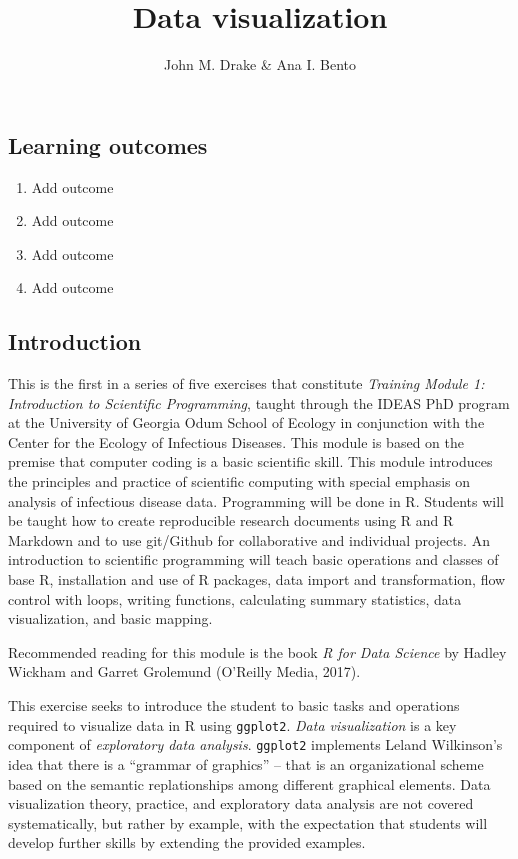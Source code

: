\documentclass[]{article}
\title{Data visualization}
\author{John M. Drake \& Ana I. Bento}
\date{}
\begin{document}
\maketitle

\hypertarget{learning-outcomes}{%
\subsection{Learning outcomes}\label{learning-outcomes}}

\begin{enumerate}
\def\labelenumi{\arabic{enumi}.}
\item
  Add outcome
\item
  Add outcome
\item
  Add outcome
\item
  Add outcome
\end{enumerate}

\hypertarget{introduction}{%
\subsection{Introduction}\label{introduction}}

This is the first in a series of five exercises that constitute
\emph{Training Module 1: Introduction to Scientific Programming}, taught
through the IDEAS PhD program at the University of Georgia Odum School
of Ecology in conjunction with the Center for the Ecology of Infectious
Diseases. This module is based on the premise that computer coding is a
basic scientific skill. This module introduces the principles and
practice of scientific computing with special emphasis on analysis of
infectious disease data. Programming will be done in R. Students will be
taught how to create reproducible research documents using R and R
Markdown and to use git/Github for collaborative and individual
projects. An introduction to scientific programming will teach basic
operations and classes of base R, installation and use of R packages,
data import and transformation, flow control with loops, writing
functions, calculating summary statistics, data visualization, and basic
mapping.

Recommended reading for this module is the book \emph{R for Data
Science} by Hadley Wickham and Garret Grolemund (O'Reilly Media, 2017).

This exercise seeks to introduce the student to basic tasks and
operations required to visualize data in R using \texttt{ggplot2}.
\emph{Data visualization} is a key component of \emph{exploratory data
analysis}. \texttt{ggplot2} implements Leland Wilkinson's idea that
there is a ``grammar of graphics'' -- that is an organizational scheme
based on the semantic replationships among different graphical elements.
Data visualization theory, practice, and exploratory data analysis are
not covered systematically, but rather by example, with the expectation
that students will develop further skills by extending the provided
examples.
\end{document}
